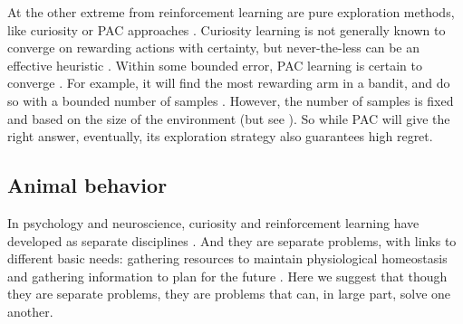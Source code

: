 \documentclass[9pt,twocolumn,twoside]{pnas-new}
\begin{document}

At the other extreme from reinforcement learning are pure exploration methods, like curiosity \cite{Berlyne1950,Jaegle2019,Pathak2017} or PAC approaches \cite{Valiant1984}. Curiosity learning is not generally known to converge on rewarding actions with certainty, but never-the-less can be an effective heuristic \cite{Pathak2017,Burda2018,Colas2019}. Within some bounded error, PAC learning is certain to converge \cite{Valiant1984}. For example, it will find the most rewarding arm in a bandit, and do so with a bounded number of samples \cite{Even-Dar2002}. However, the number of samples is fixed and based on the size of the environment (but see \cite{Even-Dar2006,Strehl2009}). So while PAC will give the right answer, eventually, its exploration strategy also guarantees high regret.



\subsection*{Animal behavior}
In psychology and neuroscience, curiosity and reinforcement learning have developed as separate disciplines \cite{Berlyne1950,Kidd2015,Sutton2018}. And they are separate problems, with links to different basic needs: gathering resources to maintain physiological homeostasis \cite{Keramati2014,Juechems2019} and gathering information to plan for the future \cite{Valiant1984,Sutton2018}. Here we suggest that though they are separate problems, they are problems that can, in large part, solve one another.
\end{document}

